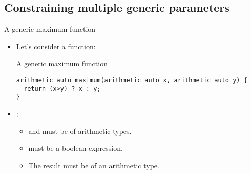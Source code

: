 \subsection{Constraining multiple generic parameters}

\begin{frame}[t,fragile]{A generic maximum function}
\begin{itemize}
  \item Let's consider a  function:

\begin{block}{A generic maximum function}
\begin{lstlisting}
arithmetic auto maximum(arithmetic auto x, arithmetic auto y) {
  return (x>y) ? x : y;
}
\end{lstlisting}
\end{block}

  \item {}:
    \begin{itemize}
      \item {} and  must be of arithmetic types.
      \item {} must be a boolean expression.
      \item The result must be of an arithmetic type.
    \end{itemize}

\end{itemize}
\end{frame}

